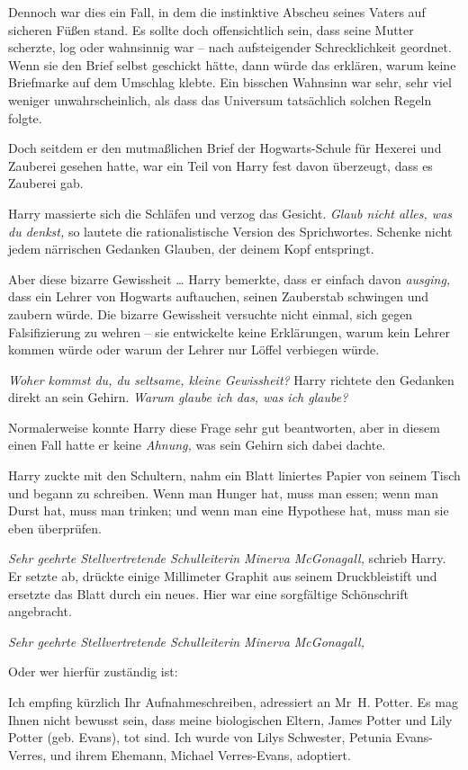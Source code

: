 {Dennoch war dies ein Fall, in dem die instinktive Abscheu seines Vaters auf sicheren Füßen stand. Es sollte doch offensichtlich sein, dass seine Mutter scherzte, log oder wahnsinnig war -- nach aufsteigender Schrecklichkeit geordnet. Wenn sie den Brief selbst geschickt hätte, dann würde das erklären, warum keine Briefmarke auf dem Umschlag klebte. Ein bisschen Wahnsinn war sehr, sehr viel weniger unwahrscheinlich, als dass das Universum tatsächlich solchen Regeln folgte.

Doch seitdem er den mutmaßlichen Brief der Hogwarts-Schule für Hexerei und Zauberei gesehen hatte, war ein Teil von Harry fest davon überzeugt, dass es Zauberei gab.

Harry massierte sich die Schläfen und verzog das Gesicht. \emph{Glaub nicht alles, was du denkst,} so lautete die rationalistische Version des Sprichwortes. Schenke nicht jedem närrischen Gedanken Glauben, der deinem Kopf entspringt.

Aber diese bizarre Gewissheit … Harry bemerkte, dass er einfach davon \emph{ausging,} dass ein Lehrer von Hogwarts auftauchen, seinen Zauberstab schwingen und zaubern würde. Die bizarre Gewissheit versuchte nicht einmal, sich gegen Falsifizierung zu wehren -- sie entwickelte keine Erklärungen, warum kein Lehrer kommen würde oder warum der Lehrer nur Löffel verbiegen würde.

\emph{Woher kommst du, du seltsame, kleine Gewissheit?} Harry richtete den Gedanken direkt an sein Gehirn. \emph{Warum glaube ich das, was ich glaube?}

Normalerweise konnte Harry diese Frage sehr gut beantworten, aber in diesem einen Fall hatte er keine \emph{Ahnung,} was sein Gehirn sich dabei dachte.

Harry zuckte mit den Schultern, nahm ein Blatt liniertes Papier von seinem Tisch und begann zu schreiben. Wenn man Hunger hat, muss man essen; wenn man Durst hat, muss man trinken; und wenn man eine Hypothese hat, muss man sie eben überprüfen.

\emph{Sehr geehrte Stellvertretende Schulleiterin Minerva McGonagall,} schrieb Harry. Er setzte ab, drückte einige Millimeter Graphit aus seinem Druckbleistift und ersetzte das Blatt durch ein neues. Hier war eine sorgfältige Schönschrift angebracht.

\emph{Sehr geehrte Stellvertretende Schulleiterin Minerva McGonagall,}

Oder wer hierfür zuständig ist:

Ich empfing kürzlich Ihr Aufnahmeschreiben, adressiert an Mr~H. Potter. Es mag Ihnen nicht bewusst sein, dass meine biologischen Eltern, James Potter und Lily Potter (geb. Evans), tot sind. Ich wurde von Lilys Schwester, Petunia Evans-Verres, und ihrem Ehemann, Michael Verres-Evans, adoptiert.

}
